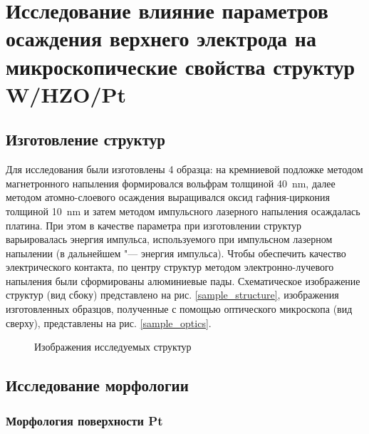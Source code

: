 \chapter{Исследование влияние параметров осаждения верхнего электрода на микроскопические свойства структур W/HZO/Pt}

\section{Изготовление структур}

Для исследования были изготовлены 4 образца: на кремниевой подложке методом магнетронного напыления формировался вольфрам толщиной \SI{40}{\nm}, далее методом атомно-слоевого осаждения выращивался оксид гафния-циркония толщиной \SI{10}{\nm} и затем методом импульсного лазерного напыления осаждалась платина. При этом в качестве параметра при изготовлении структур варьировалась энергия импульса, используемого при импульсном лазерном напылении (в дальнейшем "--- энергия импульса). Чтобы обеспечить качество электрического контакта, по центру структур методом электронно-лучевого напыления были сформированы алюминиевые пады. Схематическое изображение структур (вид сбоку) представлено на рис. \cref{sample_structure}, изображения изготовленных образцов, полученные с помощью оптического микроскопа (вид сверху), представлены на рис. \cref{sample_optics}.

\begin{figure}[ht]
    \caption[Этот текст попадает в названия рисунков в списке рисунков]{Изображения исследуемых структур}
\end{figure}

\section{Исследование морфологии}

\subsection{Морфология поверхности Pt}

